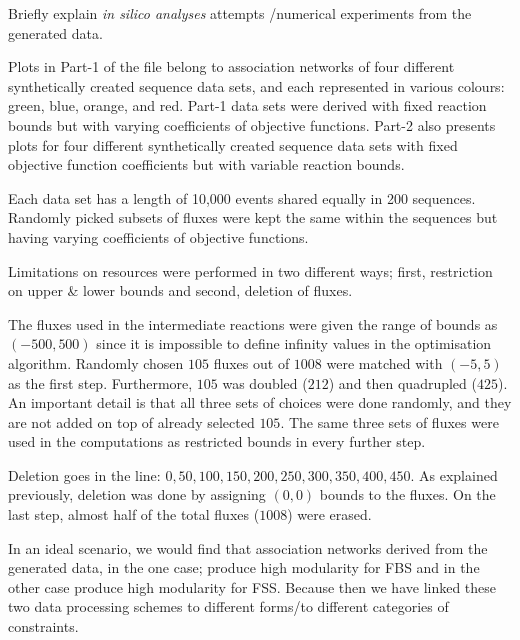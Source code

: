 {\color{red} 
	
	Briefly explain \emph{in silico analyses} attempts /numerical experiments from the generated data.
	
	Plots in Part-1 of the file belong to association networks of four different synthetically created sequence data sets, and each represented in various colours: green, blue, orange, and red. Part-1 data sets were derived with fixed reaction bounds but with varying coefficients of objective functions. Part-2 also presents plots for four different synthetically created sequence data sets with fixed objective function coefficients but with variable reaction bounds.
	
	Each data set has a length of 10,000 events shared equally in 200 sequences. Randomly picked subsets of fluxes were kept the same within the sequences but having varying coefficients of objective functions.
	
		
	Limitations on resources were performed in two different ways; first, restriction on upper \& lower bounds and second, deletion of fluxes.
	
	The fluxes used in the intermediate reactions were given the range of bounds as $(-500, 500)$ since it is impossible to define infinity values in the optimisation algorithm. Randomly chosen $105$ fluxes out of $1008$ were matched with $(-5, 5)$ as the first step. Furthermore, $105$ was doubled ($212$) and then quadrupled ($425$). An important detail is that all three sets of choices were done randomly, and they are not added on top of already selected $105$. The same three sets of fluxes were used in the computations as restricted bounds in every further step.
	
	Deletion goes in the line: $0, 50, 100, 150, 200, 250, 300, 350, 400, 450$. As explained previously, deletion was done by assigning $(0, 0)$ bounds to the fluxes. On the last step, almost half of the total fluxes ($1008$) were erased.
	
	In an ideal scenario, we would find that association networks derived from the generated data, in the one case; produce high modularity for FBS and in the other case produce high modularity for FSS. Because then we have linked these two data processing schemes to different forms/to different categories of constraints.
	
}
